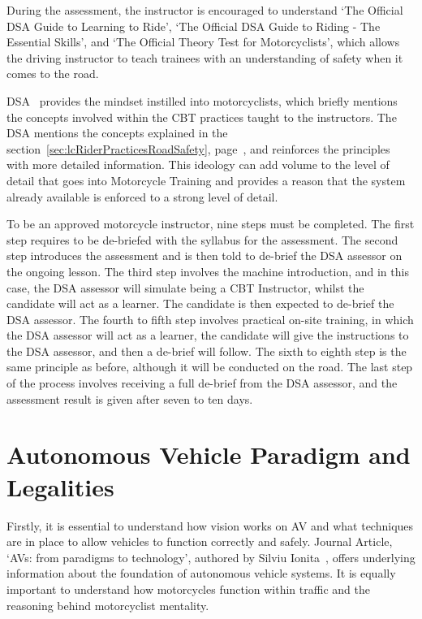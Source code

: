 \documentclass[12pt]{report} %
\begin{document}
            During the assessment, the instructor is encouraged to understand `The Official DSA Guide to Learning to Ride', `The Official DSA Guide to Riding - The Essential Skills', and `The Official Theory Test for Motorcyclists', which allows the driving instructor to teach trainees with an understanding of safety when it comes to the road.

			DSA~\cite{driving_standards_agency_compulsory_nodate} provides the mindset instilled into motorcyclists, which briefly mentions the concepts involved within the CBT practices taught to the instructors. The DSA mentions the concepts explained in the section~\ref{sec:lcRiderPracticesRoadSafety}, page~\pageref{sec:lcRiderPracticesRoadSafety}, and reinforces the principles with more detailed information. This ideology can add volume to the level of detail that goes into Motorcycle Training and provides a reason that the system already available is enforced to a strong level of detail.

            To be an approved motorcycle instructor, nine steps must be completed. The first step requires to be de-briefed with the syllabus for the assessment. The second step introduces the assessment and is then told to de-brief the DSA assessor on the ongoing lesson. The third step involves the machine introduction, and in this case, the DSA assessor will simulate being a CBT Instructor, whilst the candidate will act as a learner. The candidate is then expected to de-brief the DSA assessor. The fourth to fifth step involves practical on-site training, in which the DSA assessor will act as a learner, the candidate will give the instructions to the DSA assessor, and then a de-brief will follow. The sixth to eighth step is the same principle as before, although it will be conducted on the road. The last step of the process involves receiving a full de-brief from the DSA assessor, and the assessment result is given after seven to ten days.

	\section{Autonomous Vehicle Paradigm and Legalities}
		Firstly, it is essential to understand how vision works on AV and what techniques are in place to allow vehicles to function correctly and safely. Journal Article, `AVs: from paradigms to technology', authored by Silviu Ionita~\cite{ionita_autonomous_2017}, offers underlying information about the foundation of autonomous vehicle systems. It is equally important to understand how motorcycles function within traffic and the reasoning behind motorcyclist mentality.
\end{document}

